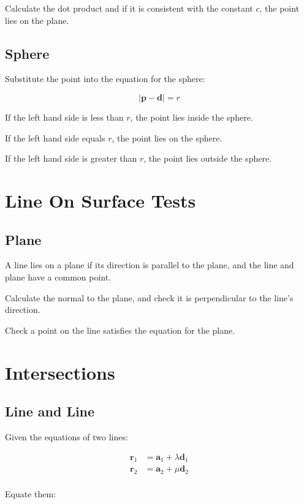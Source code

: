 \documentclass[a4paper,11pt]{report}
\newcommand{\bb}{\boldsymbol}
\begin{document}
Calculate the dot product and if it is consistent with the constant $c$, the
point lies on the plane.

\subsection{Sphere}

Substitute the point into the equation for the sphere:

$$
\lvert \bb{p} - \bb{d} \rvert = r
$$

If the left hand side is less than $r$, the point lies inside the sphere.

If the left hand side equals $r$, the point lies on the sphere.

If the left hand side is greater than $r$, the point lies outside the sphere.


\section{Line On Surface Tests}

\subsection{Plane}

A line lies on a plane if its direction is parallel to the plane, and the line
and plane have a common point.

Calculate the normal to the plane, and check it is perpendicular to the line's
direction.

Check a point on the line satisfies the equation for the plane.


\section{Intersections}

\subsection{Line and Line}

Given the equations of two lines:

$$
\begin{aligned}
\bb{r}_1 & = \bb{a}_1 + \lambda \bb{d}_1 \\
\bb{r}_2 & = \bb{a}_2 + \mu \bb{d}_2 \\
\end{aligned}
$$

Equate them:
\end{document}

